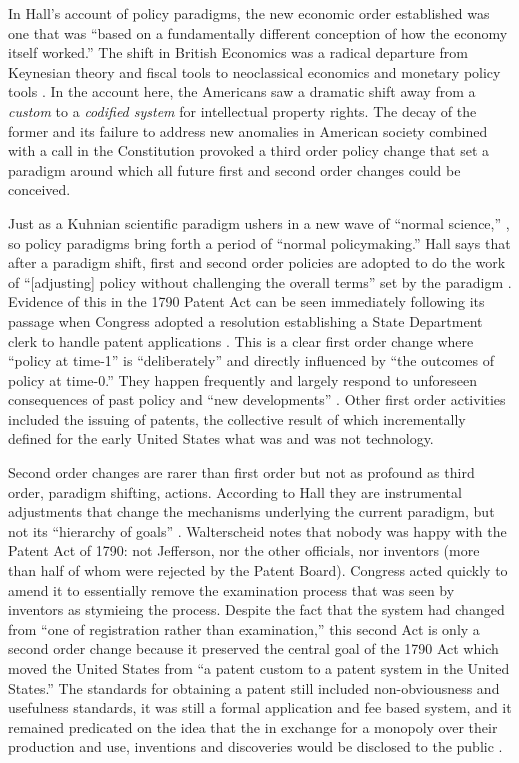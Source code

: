 \documentclass[pdftex,11pt,letterpaper]{article}
\begin{document}
In Hall's account of policy paradigms, the new economic order established was one that was ``based on a fundamentally different conception of how the economy itself worked.'' The shift in British Economics was a radical departure from Keynesian theory and fiscal tools to neoclassical economics and monetary policy tools \autocite{Hall1993}. In the account here, the Americans saw a dramatic shift away from a \emph{custom} to a \emph{codified system} for intellectual property rights. The decay of the former and its failure to address new anomalies in American society combined with a call in the Constitution provoked a third order policy change that set a paradigm around which all future first and second order changes could be conceived.

Just as a Kuhnian scientific paradigm ushers in a new wave of ``normal science,'' \autocite{Kuhn1970}, so policy paradigms bring forth a period of ``normal policymaking.'' Hall says that after a paradigm shift, first and second order policies are adopted to do the work of ``[adjusting] policy without challenging the overall terms'' set by the paradigm \autocite[279]{Hall1993}. Evidence of this in the 1790 Patent Act can be seen immediately following its passage when Congress adopted a resolution establishing a State Department clerk to handle patent applications \autocite{Federico1936}. This is a clear first order change where ``policy at time-1'' is ``deliberately'' and directly influenced by ``the outcomes of policy at time-0.'' They happen frequently and largely respond to unforeseen consequences of past policy and ``new developments'' \autocite[281]{Hall1993}. Other first order activities included the issuing of patents, the collective result of which incrementally defined for the early United States what was and was not technology.

Second order changes are rarer than first order but not as profound as third order, paradigm shifting, actions. According to Hall they are instrumental adjustments that change the mechanisms underlying the current paradigm, but not its ``hierarchy of goals'' \autocite{Hall1993}. Walterscheid notes that nobody was happy with the Patent Act of 1790: not Jefferson, nor the other officials, nor inventors (more than half of whom were rejected by the Patent Board). Congress acted quickly to amend it to essentially remove the examination process that was seen by inventors as stymieing the process. Despite the fact that the system had changed from ``one of registration rather than examination,'' \autocite{Walterscheid1999} this second Act is only a second order change because it preserved the central goal of the 1790 Act which moved the United States from ``a patent custom to a patent system in the United States.'' The standards for obtaining a patent still included non-obviousness and usefulness standards, it was still a formal application and fee based system, and it remained predicated on the idea that the in exchange for a monopoly over their production and use, inventions and discoveries would be disclosed to the public \autocite{Walterscheid1997}.



\singlespacing
\printbibliography
\end{document}
